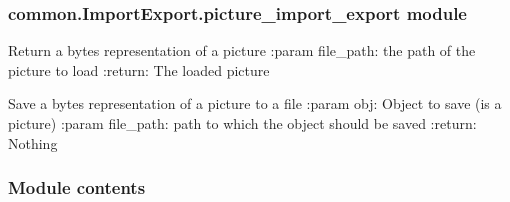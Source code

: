 \documentclass[letterpaper,10pt,english]{sphinxmanual}
\begin{document}
\subsubsection{common.ImportExport.picture\_import\_export module}
\label{\detokenize{common.ImportExport:module-common.ImportExport.picture_import_export}}\label{\detokenize{common.ImportExport:common-importexport-picture-import-export-module}}

\begin{fulllineitems}
\label{\detokenize{common.ImportExport:common.ImportExport.picture_import_export.load_picture}}
Return a bytes representation of a picture
:param file\_path: the path of the picture to load
:return: The loaded picture

\end{fulllineitems}


\begin{fulllineitems}
\label{\detokenize{common.ImportExport:common.ImportExport.picture_import_export.save_picture}}
Save a bytes representation of a picture to a file
:param obj: Object to save (is a picture)
:param file\_path: path to which the object should be saved
:return: Nothing

\end{fulllineitems}



\subsubsection{Module contents}
\label{\detokenize{common.ImportExport:module-common.ImportExport}}\label{\detokenize{common.ImportExport:module-contents}}
\end{document}
